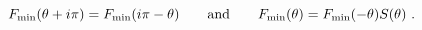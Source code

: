 \begin{equation}
F_{\text{min}}(\theta +i\pi )=F_{\text{min}}(i\pi -\theta )\qquad \text{%
and\qquad }F_{\text{min}}(\theta )=F_{\text{min}}(-\theta )S(\theta )~.
\label{Wat}
\end{equation}%
